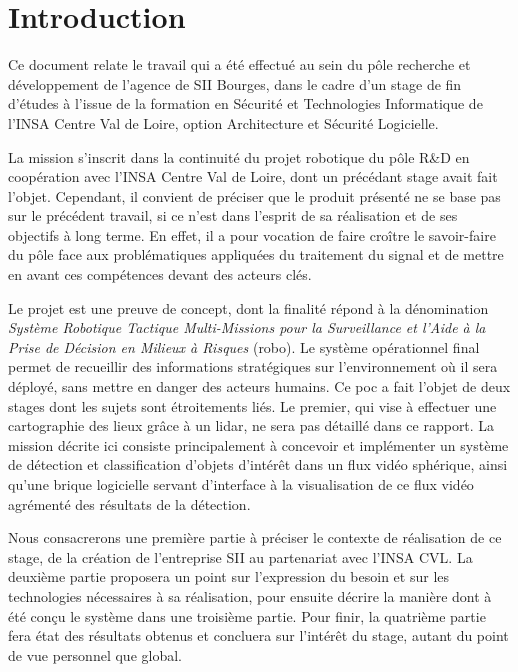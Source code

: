 \section*{Introduction}
{}
	
	Ce document relate le travail qui a été effectué au sein du pôle recherche et développement de l'agence de SII Bourges, dans le cadre d'un stage de fin d'études à l'issue de la formation en Sécurité et Technologies Informatique de l'INSA Centre Val de Loire, option Architecture et Sécurité Logicielle.
	
	La mission s'inscrit dans la continuité du projet robotique du pôle R\&D en coopération avec l'INSA Centre Val de Loire, dont un précédant stage avait fait l'objet. Cependant, il convient de préciser que le produit présenté ne se base pas sur le précédent travail, si ce n'est dans l'esprit de sa réalisation et de ses objectifs à long terme. En effet, il a pour vocation de faire croître le savoir-faire du pôle face aux problématiques appliquées du traitement du signal et de mettre en avant ces compétences devant des acteurs clés.
	
	Le projet est une preuve de concept, dont la finalité répond à la dénomination \emph{Système Robotique Tactique Multi-Missions pour la Surveillance et l'Aide à la Prise de Décision en Milieux à Risques} (\gls{robo}). Le système opérationnel final permet de recueillir des informations stratégiques sur l'environnement où il sera déployé, sans mettre en danger des acteurs humains. Ce \gls{poc} a fait l'objet de deux stages dont les sujets sont étroitements liés. Le premier, qui vise à effectuer une cartographie des lieux grâce à un \gls{lidar}, ne sera pas détaillé dans ce rapport. La mission décrite ici consiste principalement à concevoir et implémenter un système de détection et classification d'objets d'intérêt dans un flux vidéo sphérique, ainsi qu'une brique logicielle servant d'interface à la visualisation de ce flux vidéo agrémenté des résultats de la détection.
	
	Nous consacrerons une première partie à préciser le contexte de réalisation de ce stage, de la création de l'entreprise SII au partenariat avec l'INSA CVL. La deuxième partie proposera un point sur l'expression du besoin et sur les technologies nécessaires à sa réalisation, pour ensuite décrire la manière dont à été conçu le système dans une troisième partie. Pour finir, la quatrième partie fera état des résultats obtenus et concluera sur l'intérêt du stage, autant du point de vue personnel que global.
